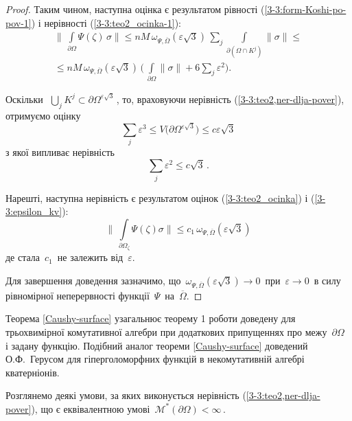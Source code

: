 \documentclass[11pt, reqno]{amsart}
\begin{document}
\begin{proof}
Таким чином, наступна оцінка є результатом рівності
(\ref{3-3:form-Koshi-po-pov-1}) і нерівності (\ref{3-3:teo2_ocinka-1}):
\begin{multline}\label{3-3:teo2_ocinka}
\biggr\|\,\int\limits_{\partial\Omega}\Psi(\zeta)\,\sigma\biggr\|
\leq nM\,\omega_{\Psi,\overline{\Omega}}(\varepsilon\sqrt{3})\,
\sum_j\int\limits_{\partial(\Omega\cap K^j)}\|\sigma\|\le\\
\leq nM\,\omega_{\Psi,\overline{\Omega}}(\varepsilon\sqrt{3})\,\bigg(\,\int\limits_{\partial\Omega}\|\sigma\|+6\sum_j\varepsilon^2\bigg).
\end{multline}

Оскільки\,\,
$\bigcup_{j}K^j\subset\partial\Omega^{\varepsilon\sqrt{3}}$\,,  то,
враховуючи нерівність (\ref{3-3:teo2,ner-dlja-pover}), отримуємо оцінку
$$\sum_j\varepsilon^3\leq V\Big(\partial\Omega^{\varepsilon\sqrt{3}}\Big)\le
c\varepsilon\sqrt{3}$$ з якої випливає нерівність
\begin{equation}\label{3-3:epsilon_kv}
\sum_j\varepsilon^2\leq c\sqrt{3}\,.
\end{equation}

Нарешті, наступна нерівність є результатом оцінок
(\ref{3-3:teo2_ocinka}) і (\ref{3-3:epsilon_kv}):
\begin{equation*}
\biggr\|\,\int\limits_{\partial\Omega_\zeta}\Psi(\zeta)\sigma\biggr\|\leq
c_1\,\omega_{\Psi,\overline{\Omega}}(\varepsilon\sqrt{3})
\end{equation*}
де стала\, $c_1$\, не залежить від\, $\varepsilon$.

Для завершення доведення зазначимо, що\,
$\omega_{\Psi,\overline{\Omega}}(\varepsilon\sqrt{3})\to 0$\, при\,
$\varepsilon\rightarrow0$\, в силу рівномірної
неперервності функції\, $\Psi$\, на\, $\overline{\Omega}$. 
 \end{proof}

\vskip 2mm


Теорема \ref{Caushy-surface}  узагальнює теорему 1 роботи \cite{Pl-Shp3} 
доведену для трьохвимірної комутативної алгебри 
при додаткових припущеннях
про межу\, $\partial\Omega$\, і задану функцію.
Подібний аналог теореми \ref{Caushy-surface}
доведений О.Ф.~Герусом \cite{Gerus-2018} для
гіперголоморфних функцій в некомутативній алгебрі кватерніонів.




Розглянемо деякі умови, за яких виконується нерівність
(\ref{3-3:teo2,ner-dlja-pover}), що є еквівалентною умові\, $\mathcal{M}^*(\partial\Omega)<\infty$\,.
\end{document}
